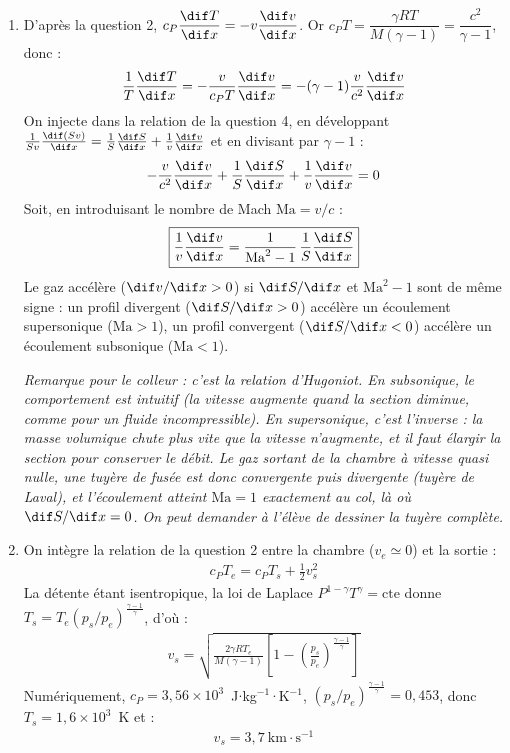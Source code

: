 \begin{correction}
\begin{enumerate}
	\item D'après la question 2, $c_P\dfrac{\dif T}{\dif x}=-v\dfrac{\dif v}{\dif x}$. Or $c_PT=\dfrac{\gamma RT}{M(\gamma-1)}=\dfrac{c^2}{\gamma-1}$, donc :
	\begin{align*}
		\frac{1}{T}\frac{\dif T}{\dif x}=-\frac{v}{c_PT}\frac{\dif v}{\dif x}=-(\gamma-1)\frac{v}{c^2}\frac{\dif v}{\dif x}
	\end{align*}
	On injecte dans la relation de la question 4, en développant $\frac{1}{Sv}\frac{\dif(Sv)}{\dif x}=\frac{1}{S}\frac{\dif S}{\dif x}+\frac{1}{v}\frac{\dif v}{\dif x}$ et en divisant par $\gamma-1$ :
	\begin{align*}
		-\frac{v}{c^2}\frac{\dif v}{\dif x}+\frac{1}{S}\frac{\dif S}{\dif x}+\frac{1}{v}\frac{\dif v}{\dif x}=0
	\end{align*}
	Soit, en introduisant le nombre de Mach $\mathrm{Ma}=v/c$ :
	\begin{align*}
		\boxed{\frac{1}{v}\frac{\dif v}{\dif x}=\frac{1}{\mathrm{Ma}^2-1}\,\frac{1}{S}\frac{\dif S}{\dif x}}
	\end{align*}
	Le gaz accélère ($\dif v/\dif x>0$) si $\dif S/\dif x$ et $\mathrm{Ma}^2-1$ sont de même signe : un profil divergent ($\dif S/\dif x>0$) accélère un écoulement supersonique ($\mathrm{Ma}>1$), un profil convergent ($\dif S/\dif x<0$) accélère un écoulement subsonique ($\mathrm{Ma}<1$).

	\textit{Remarque pour le colleur : c'est la relation d'Hugoniot. En subsonique, le comportement est intuitif (la vitesse augmente quand la section diminue, comme pour un fluide incompressible). En supersonique, c'est l'inverse : la masse volumique chute plus vite que la vitesse n'augmente, et il faut élargir la section pour conserver le débit. Le gaz sortant de la chambre à vitesse quasi nulle, une tuyère de fusée est donc convergente puis divergente (tuyère de Laval), et l'écoulement atteint $\mathrm{Ma}=1$ exactement au col, là où $\dif S/\dif x=0$. On peut demander à l'élève de dessiner la tuyère complète.}

	\item On intègre la relation de la question 2 entre la chambre ($v_e\simeq0$) et la sortie :
	\begin{align*}
		c_PT_e=c_PT_s+\frac{1}{2}v_s^2
	\end{align*}
	La détente étant isentropique, la loi de Laplace $P^{1-\gamma}T^\gamma=\text{cte}$ donne $T_s=T_e\left(p_s/p_e\right)^{\frac{\gamma-1}{\gamma}}$, d'où :
	\begin{align*}
		\boxed{v_s=\sqrt{\frac{2\gamma RT_e}{M(\gamma-1)}\left[1-\left(\frac{p_s}{p_e}\right)^{\frac{\gamma-1}{\gamma}}\right]}}
	\end{align*}
	Numériquement, $c_P=3{,}56\times10^{3}$~J$\cdot$kg$^{-1}\cdot$K$^{-1}$, $\left(p_s/p_e\right)^{\frac{\gamma-1}{\gamma}}=0{,}453$, donc $T_s=1{,}6\times10^{3}$~K et :
	\begin{align*}
		v_s=3{,}7~\text{km}\cdot\text{s}^{-1}
	\end{align*}


\end{enumerate}
\end{correction}
